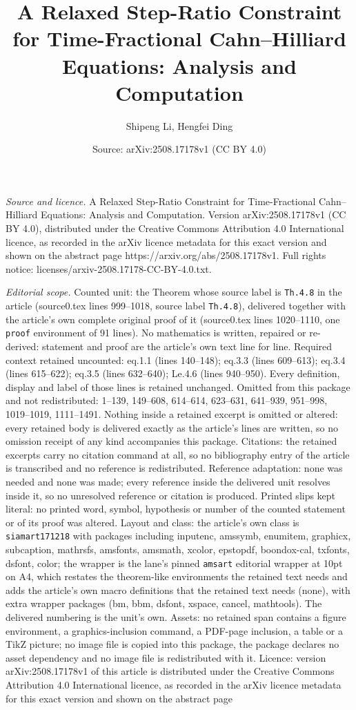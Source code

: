 \documentclass[10pt,a4paper]{amsart}
\title[A Relaxed Step-Ratio Constraint for Time-Fractional Cahn--Hi]{A Relaxed Step-Ratio Constraint for Time-Fractional Cahn--Hilliard Equations: Analysis and Computation}
\author{Shipeng Li, Hengfei Ding}
\date{Source: arXiv:2508.17178v1 (CC BY 4.0)}
\begin{document}
\maketitle

\noindent\emph{Source and licence.} A Relaxed Step-Ratio Constraint for Time-Fractional Cahn--Hilliard Equations: Analysis and Computation. Version arXiv:2508.17178v1 (CC BY 4.0), distributed under the Creative Commons Attribution 4.0 International licence, as recorded in the arXiv licence metadata for this exact version and shown on the abstract page https://arxiv.org/abs/2508.17178v1. Full rights notice: licenses/arxiv-2508.17178-CC-BY-4.0.txt.\par\smallskip

\noindent\textit{Editorial scope.} Counted unit: the Theorem whose source label is \texttt{Th.4.8} in the article (source0.tex lines 999--1018, source label \texttt{Th.4.8}), delivered together with the article's own complete original proof of it (source0.tex lines 1020--1110, one \texttt{proof} environment of 91 lines). No mathematics is written, repaired or re-derived: statement and proof are the article's own text line for line. Required context retained uncounted: eq.1.1 (lines 140--148); eq.3.3 (lines 609--613); eq.3.4 (lines 615--622); eq.3.5 (lines 632--640); Le.4.6 (lines 940--950). Every definition, display and label of those lines is retained unchanged. Omitted from this package and not redistributed: 1--139, 149--608, 614--614, 623--631, 641--939, 951--998, 1019--1019, 1111--1491. Nothing inside a retained excerpt is omitted or altered: every retained body is delivered exactly as the article's lines are written, so no omission receipt of any kind accompanies this package. Citations: the retained excerpts carry no citation command at all, so no bibliography entry of the article is transcribed and no reference is redistributed. Reference adaptation: none was needed and none was made; every reference inside the delivered unit resolves inside it, so no unresolved reference or citation is produced. Printed slips kept literal: no printed word, symbol, hypothesis or number of the counted statement or of its proof was altered. Layout and class: the article's own class is \texttt{siamart171218} with packages including inputenc, amssymb, enumitem, graphicx, subcaption, mathrsfs, amsfonts, amsmath, xcolor, epstopdf, boondox-cal, txfonts, dsfont, color; the wrapper is the lane's pinned \texttt{amsart} editorial wrapper at 10pt on A4, which restates the theorem-like environments the retained text needs and adds the article's own macro definitions that the retained text needs (none), with extra wrapper packages (bm, bbm, dsfont, xspace, cancel, mathtools). The delivered numbering is the unit's own. Assets: no retained span contains a figure environment, a graphics-inclusion command, a PDF-page inclusion, a table or a TikZ picture; no image file is copied into this package, the package declares no asset dependency and no image file is redistributed with it. Licence: version arXiv:2508.17178v1 of this article is distributed under the Creative Commons Attribution 4.0 International licence, as recorded in the arXiv licence metadata for this exact version and shown on the abstract page 
\end{document}
